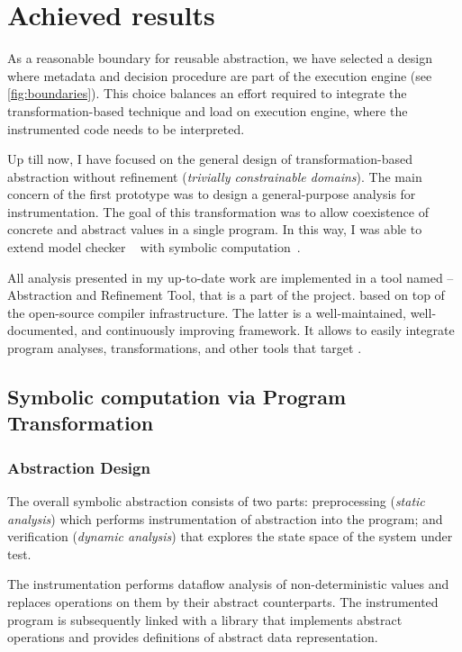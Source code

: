 \chapter{Achieved results}
\label{ch:results}


As a reasonable boundary for reusable abstraction, we have selected a design
where metadata and decision procedure are part of the execution engine (see
\autoref{fig:boundaries}). This choice balances an effort required to integrate the
transformation-based technique and load on execution engine, where the
instrumented code needs to be interpreted.

Up till now, I have focused on the general design of trans\-for\-mation-based
abstraction without refinement (\emph{trivially constrainable domains}). The
main concern of the first prototype was to design a general-purpose analysis
for instrumentation. The goal of this transformation was to allow coexistence
of concrete and abstract values in a single program. In this way, I was able to
extend model checker \divine~\cite{Divine17} with symbolic
computation~\cite{Lauko2019Sym, Lauko2018SymComp}.

All analysis presented in my up-to-date work are implemented in a tool named
\lart -- \llvm Abstraction and Refinement Tool, that is a part of the \divine
project. \lart based on top of the open-source \llvm compiler infrastructure.
The latter is a well-maintained, well-documented, and continuously improving
framework. It allows \lart to easily integrate program analyses,
transformations, and other tools that target \llvm.

\section{Symbolic computation via Program Transformation}
\label{sec:symbolic}

\subsection{Abstraction Design}

The overall symbolic abstraction consists of two parts: preprocessing (\emph{static
analysis}) which performs instrumentation of abstraction into the program; and
verification (\emph{dynamic analysis}) that explores the state space of the
system under test.

The instrumentation performs dataflow analysis of non-de\-ter\-ministic values and
replaces operations on them by their abstract counterparts. The instrumented
program is subsequently linked with a library that implements abstract
operations and provides definitions of abstract data representation.


